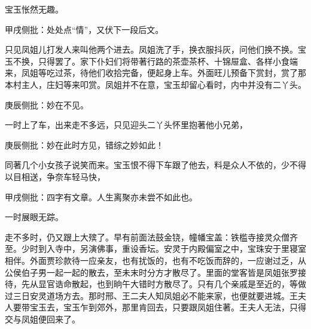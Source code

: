 \begin{parag}


    宝玉怅然无趣。\begin{note}甲戌侧批：处处点“情”，又伏下一段后文。\end{note}只见凤姐儿打发人来叫他两个进去。凤姐洗了手，换衣服抖灰，问他们换不换。宝玉不换，只得罢了。家下仆妇们将带著行路的茶壶茶杯、十锦屉盒、各样小食端来，凤姐等吃过茶，待他们收拾完备，便起身上车。外面旺儿预备下赏封，赏了那本村主人，庄妇等来叩赏。凤姐并不在意，宝玉却留心看时，内中并没有二丫头。\begin{note}庚辰侧批：妙在不见。\end{note}一时上了车，出来走不多远，只见迎头二丫头怀里抱著他小兄弟，\begin{note}庚辰侧批：妙在此时方见，错综之妙如此！\end{note}同著几个小女孩子说笑而来。宝玉恨不得下车跟了他去，料是众人不依的，少不得以目相送，争奈车轻马快，\begin{note}甲戌侧批：四字有文章。人生离聚亦未尝不如此也。\end{note}一时展眼无踪。
\end{parag}


\begin{parag}


    走不多时，仍又跟上大殡了。早有前面法鼓金铙，幢幡宝盖：铁槛寺接灵众僧齐至。少时到入寺中，另演佛事，重设香坛。安灵于内殿偏室之中，宝珠安于里寝室相伴。外面贾珍款待一应亲友，也有扰饭的，也有不吃饭而辞的，一应谢过乏，从公侯伯子男一起一起的散去，至未末时分方才散尽了。里面的堂客皆是凤姐张罗接待，先从显官诰命散起，也到晌午大错时方散尽了。只有几个亲戚是至近的，等做过三日安灵道场方去。那时邢、王二夫人知凤姐必不能来家，也便就要进城。王夫人要带宝玉去，宝玉乍到郊外，那里肯回去，只要跟凤姐住著。王夫人无法，只得交与凤姐便回来了。
\end{parag}


